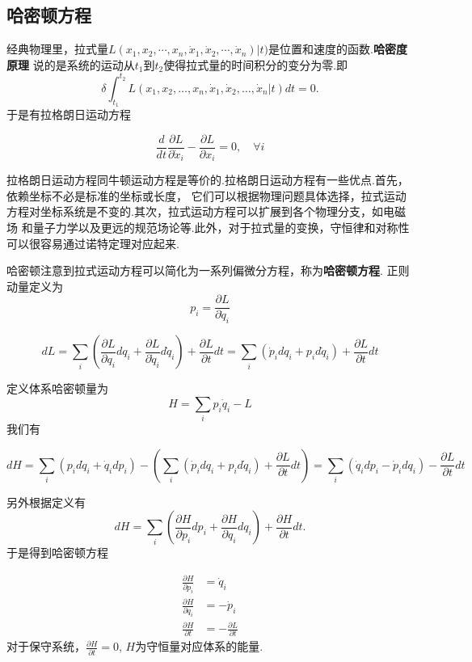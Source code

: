 \subsection{哈密顿方程}
经典物理里，拉式量$L(x_1, x_2, \cdots, x_n, \dot{x}_1, \dot{x}_2, \cdots, \dot{x}_n)|t)$是位置和速度的函数.\textbf{哈密度原理}
说的是系统的运动从$t_1$到$t_2$使得拉式量的时间积分的变分为零.即
\begin{equation}
    \delta \int_{t_1}^{t_2} L\left(x_1, x_2, \ldots, x_n, \dot{x}_1, \dot{x}_2, \ldots, \dot{x}_n | t\right) d t=0 .
\end{equation}
于是有拉格朗日运动方程

\begin{equation}
    \frac{d}{d t} \frac{\partial L}{\partial \dot{x}_i}-\frac{\partial L}{\partial x_i}=0, \quad \forall i
\end{equation}

拉格朗日运动方程同牛顿运动方程是等价的.拉格朗日运动方程有一些优点.首先，依赖坐标不必是标准的坐标或长度，
它们可以根据物理问题具体选择，拉式运动方程对坐标系统是不变的.其次，拉式运动方程可以扩展到各个物理分支，如电磁场
和量子力学以及更远的规范场论等.此外，对于拉式量的变换，守恒律和对称性可以很容易通过诺特定理对应起来.


哈密顿注意到拉式运动方程可以简化为一系列偏微分方程，称为\textbf{哈密顿方程}.
正则动量定义为
\begin{equation}
    p_i=\frac{\partial L}{\partial \dot{q}_i}
\end{equation}

\begin{equation}
    d L=\sum_i\left(\frac{\partial L}{\partial q_i} d q_i+\frac{\partial L}{\partial \dot{q}_i} d \dot{q}_i\right)+\frac{\partial L}{\partial t} d t=\sum_i\left(\dot{p}_i d q_i+p_i d \dot{q}_i\right)+\frac{\partial L}{\partial t} d t
\end{equation}

定义体系哈密顿量为
\begin{equation}
    H=\sum_i p_i \dot{q}_i-L
\end{equation}
我们有

\begin{equation}
    d H=\sum_i\left(p_i d \dot{q}_i+\dot{q}_i d p_i\right)-\left(\sum_i\left(\dot{p}_i d q_i+p_i d \dot{q}_i\right)+\frac{\partial L}{\partial t} d t\right)=\sum_i\left(\dot{q}_i d p_i-\dot{p}_i d q_i\right)-\frac{\partial L}{\partial t} d t
\end{equation}

另外根据定义有
\begin{equation}
    d H=\sum_i\left(\frac{\partial H}{\partial p_i} d p_i+\frac{\partial H}{\partial q_i} d q_i\right)+\frac{\partial H}{\partial t} d t .
\end{equation}
于是得到哈密顿方程

\begin{align}
    \frac{\partial H}{\partial p_i}&=\dot{q}_i
    \\
    \frac{\partial H}{\partial q_i}&=-\dot{p}_i
    \\
    \frac{\partial H}{\partial t}&=-\frac{\partial L}{\partial t}
\end{align}
对于保守系统，$\frac{\partial H}{\partial t}=0$, $H$为守恒量对应体系的能量.